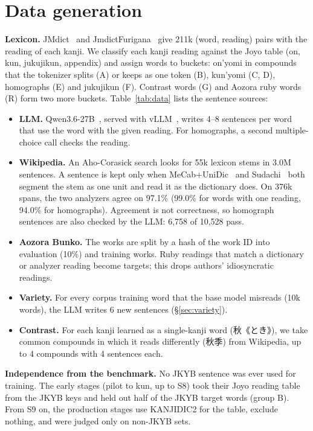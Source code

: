 \documentclass[10pt,a4paper,twocolumn]{article}
\begin{document}
\section{Data generation}\label{sec:data}
\textbf{Lexicon.} JMdict~\cite{jmdict} and JmdictFurigana~\cite{jmdictfurigana} give 211k
(word, reading) pairs with the reading of each kanji. We classify each kanji reading against the
Joyo table (on, kun, jukujikun, appendix) and assign words to buckets: on'yomi in compounds that
the tokenizer splits (A) or keeps as one token (B), kun'yomi (C, D), homographs (E) and
jukujikun (F). Contrast words (G) and Aozora ruby words (R) form two more buckets.
Table~\ref{tab:data} lists the sentence sources:
\begin{itemize}
\item \textbf{LLM.} Qwen3.6-27B~\cite{qwen3}, served with vLLM~\cite{vllm}, writes 4--8
  sentences per word that use the word with the given reading. For homographs, a second
  multiple-choice call checks the reading.
\item \textbf{Wikipedia.} An Aho-Corasick search looks for 55k lexicon stems in 3.0M sentences.
  A sentence is kept only when MeCab+UniDic~\cite{mecab,unidic} and Sudachi~\cite{sudachi} both
  segment the stem as one unit and read it as the dictionary does. On 376k spans, the two
  analyzers agree on 97.1\% (99.0\% for words with one reading, 94.0\% for homographs).
  Agreement is not correctness, so homograph sentences are also checked by the LLM: 6,758 of
  10,528 pass.
\item \textbf{Aozora Bunko.} The works are split by a hash of the work ID into evaluation
  (10\%) and training works. Ruby readings that match a dictionary or analyzer reading become
  targets; this drops authors' idiosyncratic readings.
\item \textbf{Variety.} For every corpus training word that the base model misreads (10k
  words), the LLM writes 6 new sentences (\S\ref{sec:variety}).
\item \textbf{Contrast.} For each kanji learned as a single-kanji word (秋《とき》), we take
  common compounds in which it reads differently (秋季) from Wikipedia, up to 4 compounds with
  4 sentences each.
\end{itemize}

\textbf{Independence from the benchmark.} No JKYB sentence was ever used for training. The
early stages (pilot to kun, up to S8) took their Joyo reading table from the JKYB keys and held
out half of the JKYB target words (group B). From S9 on, the production stages use KANJIDIC2
for the table, exclude nothing, and were judged only on non-JKYB sets.
\end{document}
